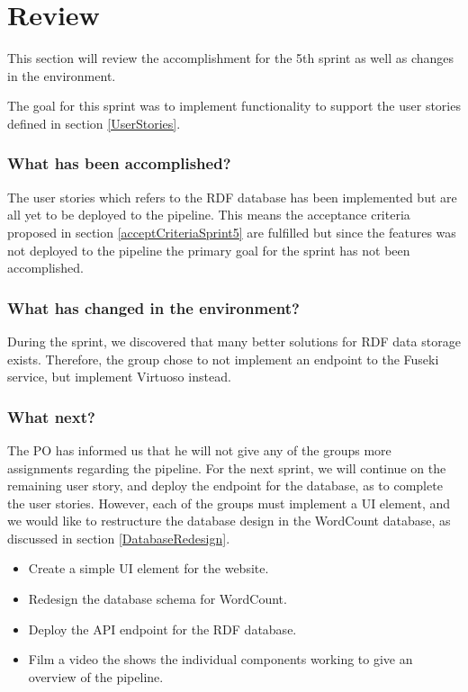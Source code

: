 \section{Review}
This section will review the accomplishment for the 5th sprint as well as changes in the \knox{} environment. 

The goal for this sprint was to implement functionality to support the user stories defined in section \ref{UserStories}. 

\subsubsection*{What has been accomplished?}
The user stories which refers to the RDF database has been implemented but are all yet to be deployed to the \knux{} pipeline. This means the acceptance criteria proposed in section \ref{acceptCriteriaSprint5} are fulfilled but since the features was not deployed to the pipeline the primary goal for the sprint has not been accomplished. 

\subsubsection*{What has changed in the environment?}
During the sprint, we discovered that many better solutions for RDF data storage exists. Therefore, the group chose to not implement an endpoint to the Fuseki service, but implement Virtuoso instead. 

\subsubsection*{What next?}
The PO has informed us that he will not give any of the \knox{} groups more assignments regarding the pipeline. 
For the next sprint, we will continue on the remaining user story, and deploy the endpoint for the database, as to complete the user stories. 
However, each of the \knox{} groups must implement a UI element, and we would like to restructure the database design in the WordCount database, as discussed in section \ref{DatabaseRedesign}.

\begin{itemize}
    \item Create a simple UI element for the \knox{} website.
    \item Redesign the database schema for WordCount.
    \item Deploy the API endpoint for the RDF database.
    \item Film a video the shows the individual components working to give an overview of the pipeline.
\end{itemize}

